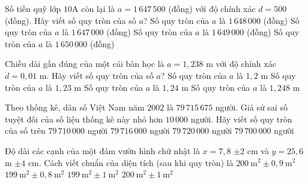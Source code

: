 \begin{ex}%
	Số tiền quỹ lớp $10$A còn lại là $a=1\,647\,500$ (đồng) với độ chính xác $d=500$ (đồng). Hãy viết  số quy tròn của số $a$?
	\choice 
		{\True  Số quy tròn của $a$ là $1\,648\,000$ (đồng)}
		{Số quy tròn của $a$ là $1\,647\,000$ (đồng)} 
		{Số quy tròn của $a$ là $1\,649\,000$  (đồng)}
		{Số quy tròn của $a$ là $1\,650\,000$  (đồng)}
\end{ex}

\begin{ex}%
	Chiều dài gần đúng của một cái bàn học là $a=1{,}238$ m với độ chính xác $d=0{,}01$ m. Hãy  viết số quy tròn của số $a$?
	 \choice
		 {\True Số quy tròn của $a$ là $1{,}2$ m}
		{Số quy tròn của  $a$ là $1{,}23$ m}
		{Số quy tròn của $a$  là $1{,}24$ m}
		{Số  quy tròn của $a$ là $1{,}248$ m}
\end{ex}

\begin{ex}%
	Theo thống kê, dân số Việt Nam năm $2002$ là $79\,715\,675$ người. Giả sử sai số tuyệt đối của số  liệu thống kê này nhỏ hơn $10\,000$ người. Hãy viết số quy tròn của số trên
	 \choice
		 {$79\,710\,000$ người}
		{$79\,716\,000$ người} 
		{\True $79\,720\,000$  người}
		 {$79\,700\,000$ người}
\end{ex}

\begin{ex}%
	Độ dài các cạnh của một đám vườn hình chữ nhật là $x=7{,}8$ $\pm 2$ cm và $y=25{,}6$ m $\pm 4$ cm. Cách viết chuẩn của diện tích (sau khi quy  tròn) là
	 \choice
		{$200\mathrm{~m}^2\pm 0{,}9\mathrm{~m}^2$} 
		 {$199\mathrm{~m}^2\pm 0{,}8\mathrm{~m}^2$}
		 {$199\mathrm{~m}^2\pm 1\mathrm{~m}^2$}
		{\True $200\mathrm{~m}^2\pm 1\mathrm{~m}^2$} 
\end{ex}

